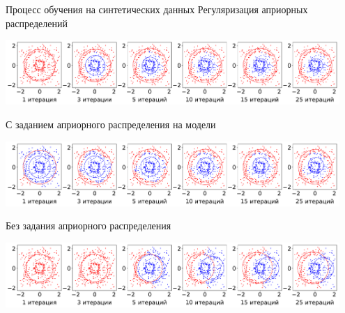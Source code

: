 \documentclass[9pt,pdf,hyperref={unicode}]{beamer}
\begin{document}
\begin{frame}{Процесс обучения на синтетических данных}
\justifying
Регуляризация априорных распределений
\begin{center}
	\includegraphics[width=0.95\textwidth]{result/experiment_synt_regular_progress}
\end{center}
С заданием априорного распределения на модели
\begin{center}
	\includegraphics[width=0.95\textwidth]{result/experiment_synt_prior_progress}
\end{center}
Без задания априорного распределения
\begin{center}
	\includegraphics[width=0.95\textwidth]{result/experiment_synt_not_prior_progress}
\end{center}
\end{frame}
\end{document}
